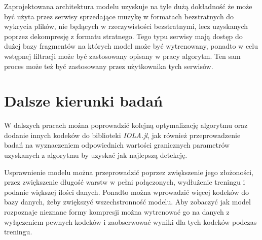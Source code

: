 \documentclass[pl,12pt]{aghdpl}
\let\Oldsection\section%
\renewcommand{\section}{\FloatBarrier\Oldsection}
\begin{document}
Zaprojektowana architektura modelu uzyskuje na tyle dużą dokładność że może być
użyta przez serwisy sprzedające muzykę w formatach bezstratnych do wykrycia
plików, nie będących w rzeczywistości bezstratnymi, lecz uzyskanych poprzez
dekompresję z formatu stratnego. Tego typu serwisy mają dostęp do dużej bazy
fragmentów na których model może być wytrenowany, ponadto w celu wstępnej
filtracji może być zastosowany opisany w pracy algorytm. Ten sam proces może
też być zastosowany przez użytkownika tych serwisów.

\section{Dalsze kierunki badań}

W dalszych pracach można poprowadzić kolejną optymalizację algorytmu oraz
dodanie innych kodeków do biblioteki \textit{IOLA.jl}, jak również
przeprowadzenie badań na wyznaczeniem odpowiednich wartości granicznych
parametrów uzyskanych z algorytmu by uzyskać jak najlepszą detekcję.

Usprawnienie modelu można przeprowadzić poprzez zwiększenie jego złożoności,
przez zwiększenie długość warstw w pełni połączonych, wydłużenie treningu i
podanie większej ilości danych. Ponadto można wprowadzić więcej kodeków do bazy
danych, żeby zwiększyć wszechstronność modelu. Aby zobaczyć jak model
rozpoznaje nieznane formy kompresji można wytrenować go na danych z wyłączeniem
pewnych kodeków i zaobserwować wyniki dla tych kodeków podczas treningu.


\cleardoublepage{}
\printbibliography{}
\end{document}
